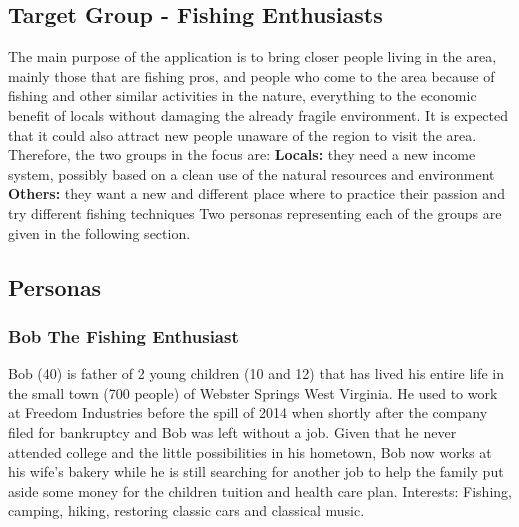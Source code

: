 \subsection{Target Group - Fishing Enthusiasts}
The main purpose of the application is to bring closer people living in the area, mainly those that are fishing pros, and people who come to the area because of fishing and other similar activities in the nature, everything to the economic benefit of locals without damaging the already fragile environment. It is expected that it could also attract new people unaware of the region to visit the area. Therefore, the two groups in the focus are:  
\newline
\textbf{Locals:} they need a new income system, possibly based on a clean use of the natural resources and environment 
\newline
\textbf{Others:} they want a new and different place where to practice their passion and try different fishing techniques 
\newline 
\newline
Two personas representing each of the groups are given in the following section.

\subsection{Personas}
\subsubsection*{Bob The Fishing Enthusiast}
Bob (40) is father of 2 young children (10 and 12) that has lived his entire life in the small town (700 people) of Webster Springs West Virginia. He used to work at Freedom Industries before the spill of 2014 when shortly after the company filed for bankruptcy and Bob was left without a job. Given that he never attended college and the little possibilities in his hometown, Bob now works at his wife's bakery while he is still searching for another job to help the family put aside some money for the children tuition and health care plan.
\newline
Interests: Fishing, camping, hiking, restoring classic cars and classical music. 
\newline



